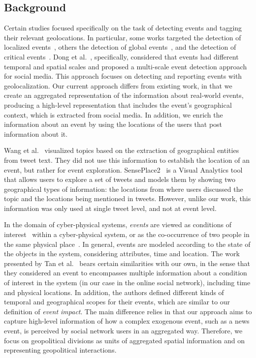 \subsection{Background}\label{sec:related}

Certain studies focused specifically on the task of detecting events and tagging
their relevant geolocations. 
%
In particular, some works targeted the detection of localized
events~\cite{Watanabe:Jasmine:2011,Abdelhaq:EvenTweet:2013,Walther:2013fb,Lee:A:2011,Krumm:2015},
others the detection of global events~\cite{sankaranarayanan:twitterstand:2009},
and the detection of critical
events~\cite{Sakaki:Tweet:2013,DeLongueville:2009}.  
%
Dong et al.~\cite{Dong2015}, specifically, considered that events had different
temporal and spatial scales and proposed a multi-scale event detection approach
for social media. 
%
This approach focuses on detecting and reporting events with geolocalization.
%
Our current approach differs from existing work, in that we create an aggregated
representation of the information about real-world events, producing a
high-level representation that includes the event's geographical context, which
is extracted from social media. 
%
In addition, we enrich the information about an event by using the locations of
the users that post information about it.

Wang et al.~\cite{Wang:LeadLine:2012} visualized topics based on the extraction
of geographical entities from tweet text. 
%
They did not use this information to establish the location of an event, but
rather for event exploration. 
%
SensePlace2~\cite{MacEachren:SensePlace2:2011} is a Visual Analytics tool that
allows users to explore a set of tweets and models them by showing two
geographical types of information: the locations from where users discussed the
topic and the locations being mentioned in tweets. 
%
However, unlike our work, this information was only used at single tweet level,
and not at event level.

In the domain of cyber-physical systems, {\em events} are viewed as conditions
of interest~\cite{st-model_2009} within a cyber-physical system, or as the
co-occurrence of two people in the same physical place~\cite{STEvent_2010}.
%
In general, events are modeled according to the state of the objects in the
system, considering attributes, time and location. 
%
The work presented by Tan et al.~\cite{st-model_2009} bears certain similarities
with our own, in the sense that they considered an event to encompasses multiple
information about a condition of interest in the system (in our case in the
online social network), including time and physical locations. 
%
In addition, the authors defined different kinds of temporal and geographical
scopes for their events, which are similar to our definition of {\em event
impact}. 
%
The main difference relies in that our approach aims to capture high-level
information of how a complex exogenous event, such as a news event, is perceived
by social network users in an aggregated way. 
%
Therefore, we focus on geopolitical divisions as units of aggregated spatial
information and on representing geopolitical interactions.

